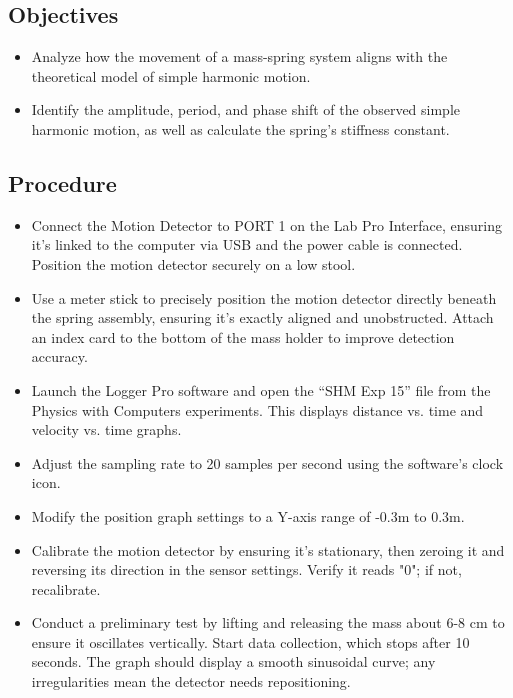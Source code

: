 \documentclass{report}
\begin{document}
\bigbreak \noindent 
\subsection{Objectives}
\begin{itemize}
    \item Analyze how the movement of a mass-spring system aligns with the theoretical model of simple harmonic motion.
    \item Identify the amplitude, period, and phase shift of the observed simple harmonic motion, as well as calculate the spring's stiffness constant.
\end{itemize}


\bigbreak \noindent 
\subsection{Procedure}
\begin{itemize}
    \item Connect the Motion Detector to PORT 1 on the Lab Pro Interface, ensuring it's linked to the computer via USB and the power cable is connected. Position the motion detector securely on a low stool.
    \item Use a meter stick to precisely position the motion detector directly beneath the spring assembly, ensuring it's exactly aligned and unobstructed. Attach an index card to the bottom of the mass holder to improve detection accuracy.
    \item Launch the Logger Pro software and open the “SHM Exp 15” file from the Physics with Computers experiments. This displays distance vs. time and velocity vs. time graphs.
    \item Adjust the sampling rate to 20 samples per second using the software's clock icon.
    \item Modify the position graph settings to a Y-axis range of -0.3m to 0.3m.
    \item Calibrate the motion detector by ensuring it's stationary, then zeroing it and reversing its direction in the sensor settings. Verify it reads "0"; if not, recalibrate.
    \item Conduct a preliminary test by lifting and releasing the mass about 6-8 cm to ensure it oscillates vertically. Start data collection, which stops after 10 seconds. The graph should display a smooth sinusoidal curve; any irregularities mean the detector needs repositioning.
\end{itemize}
\end{document}
